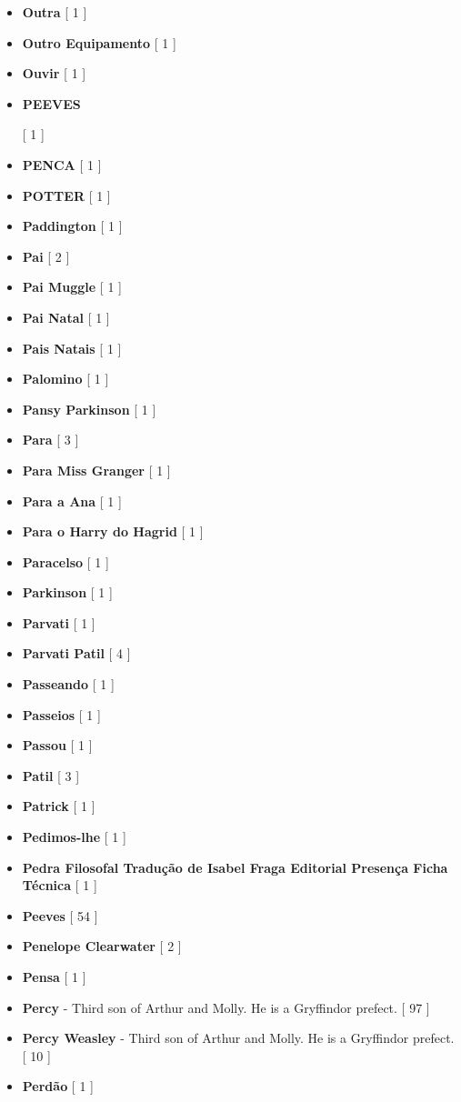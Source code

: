\documentclass[a4paper]{article}
\begin{document}
{\begin{itemize}
	\item \textbf{Outra} [ 1 ]
	\item \textbf{Outro Equipamento} [ 1 ]
	\item \textbf{Ouvir} [ 1 ]
	\item \hypertarget{P}{\textbf{PEEVES}} [ 1 ]
	\item \textbf{PENCA} [ 1 ]
	\item \textbf{POTTER} [ 1 ]
	\item \textbf{Paddington} [ 1 ]
	\item \textbf{Pai} [ 2 ]
	\item \textbf{Pai Muggle} [ 1 ]
	\item \textbf{Pai Natal} [ 1 ]
	\item \textbf{Pais Natais} [ 1 ]
	\item \textbf{Palomino} [ 1 ]
	\item \textbf{Pansy Parkinson} [ 1 ]
	\item \textbf{Para} [ 3 ]
	\item \textbf{Para Miss Granger} [ 1 ]
	\item \textbf{Para a Ana} [ 1 ]
	\item \textbf{Para o Harry do Hagrid} [ 1 ]
	\item \textbf{Paracelso} [ 1 ]
	\item \textbf{Parkinson} [ 1 ]
	\item \textbf{Parvati} [ 1 ]
	\item \textbf{Parvati Patil} [ 4 ]
	\item \textbf{Passeando} [ 1 ]
	\item \textbf{Passeios} [ 1 ]
	\item \textbf{Passou} [ 1 ]
	\item \textbf{Patil} [ 3 ]
	\item \textbf{Patrick} [ 1 ]
	\item \textbf{Pedimos-lhe} [ 1 ]
	\item \textbf{Pedra Filosofal Tradução de Isabel Fraga Editorial Presença Ficha Técnica} [ 1 ]
	\item \textbf{Peeves} [ 54 ]
	\item \textbf{Penelope Clearwater} [ 2 ]
	\item \textbf{Pensa} [ 1 ]
	\item \textbf{Percy} - Third son of Arthur and Molly. He is a Gryffindor prefect. [ 97 ]
	\item \textbf{Percy Weasley} - Third son of Arthur and Molly. He is a Gryffindor prefect. [ 10 ]
	\item \textbf{Perdão} [ 1 ]

\end{itemize}}
\end{document}
